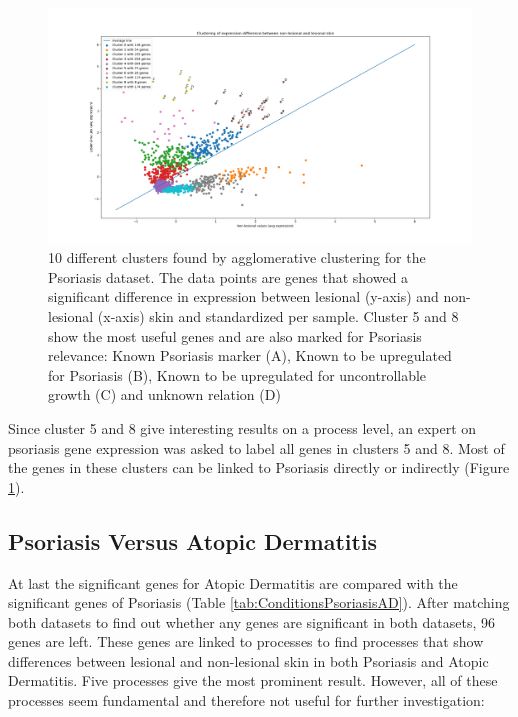 \documentclass[10pt,a4paper]{article}
\begin{document}
	\begin{figure}[H]
		\includegraphics[width=\textwidth]{10_Clusters_Psoriasis_Results.png}
	
		\caption{10 different clusters found by agglomerative clustering for the Psoriasis dataset. The data points are genes that showed a significant difference in expression between lesional (y-axis) and non-lesional (x-axis) skin and standardized per sample. Cluster 5 and 8 show the most useful genes and are also marked for Psoriasis relevance: Known Psoriasis marker (A), Known to be upregulated for Psoriasis (B), Known to be upregulated for uncontrollable growth (C) and unknown relation (D)}
		\label{fig:ClusteredGenes}
	\end{figure}
	
	Since cluster 5 and 8 give interesting results on a process level, an expert on psoriasis gene expression was asked to label all genes in clusters 5 and 8. Most of the genes in these clusters can be linked to Psoriasis directly or indirectly (Figure \ref{fig:ClusteredGenes}).
	
	\subsection{Psoriasis Versus Atopic Dermatitis}
	\label{subsec:ResultsPsoriasisVersusAtopicDermatitis}
	
	At last the significant genes for Atopic Dermatitis are compared with the significant genes of Psoriasis (Table \ref{tab:ConditionsPsoriasisAD}). After matching both datasets to find out whether any genes are significant in both datasets, 96 genes are left. These genes are linked to processes to find processes that show differences between lesional and non-lesional skin in both Psoriasis and Atopic Dermatitis. Five processes give the most prominent result. However, all of these processes seem fundamental and therefore not useful for further investigation:
	
\end{document}
